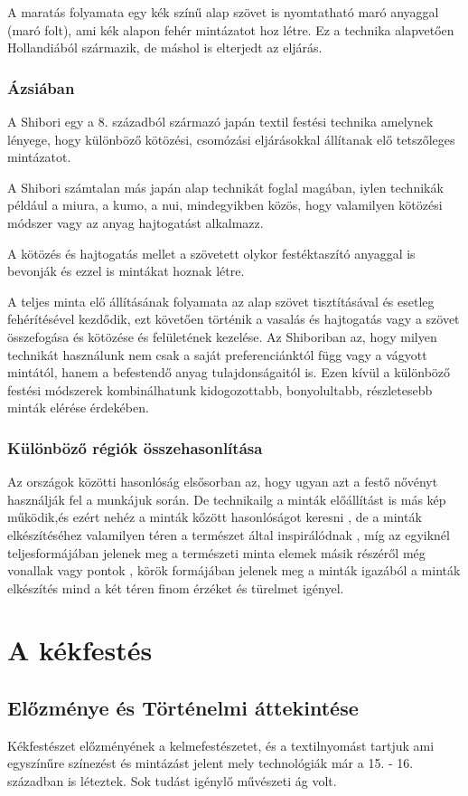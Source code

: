 \documentclass[fontsize=12pt, appendixprefix=true]{scrreprt}
\begin{document}
A maratás folyamata egy kék színű alap szövet is nyomtatható maró anyaggal (maró folt), ami kék alapon fehér mintázatot hoz  létre. Ez a technika alapvetően Hollandiából származik, de máshol is elterjedt az eljárás.

\subsection{Ázsiában}
A Shibori egy a 8. századból származó japán textil festési technika \cite{shibori} amelynek lényege, hogy különböző kötözési, csomózási eljárásokkal állítanak elő tetszőleges mintázatot.

A Shibori számtalan más japán alap technikát foglal magában, iylen technikák például a miura, a kumo, a nui, mindegyikben közös, hogy valamilyen kötözési módszer vagy az anyag hajtogatást alkalmazz. 

A kötözés és hajtogatás mellet a szövetett olykor festéktaszító anyaggal is bevonják és ezzel is mintákat hoznak létre.

A teljes minta elő állításának folyamata az alap szövet tisztításával és esetleg fehérítésével kezdődik, ezt követően történik a vasalás és hajtogatás vagy a szövet összefogása és kötözése és felületének kezelése.
Az Shiboriban az, hogy milyen technikát használunk nem csak a saját preferenciánktól függ vagy a vágyott mintától, hanem a befestendő anyag tulajdonságaitól is. Ezen kívül  a különböző festési módszerek kombinálhatunk kidogozottabb, bonyolultabb, részletesebb minták elérése érdekében. 

\subsection{Különböző régiók összehasonlítása}
   Az országok közötti hasonlóság elsősorban az, hogy ugyan azt a festő nővényt használják fel a munkájuk során.
   De technikailg a minták előállítást is más kép működik,és ezért nehéz a minták kőzött hasonlóságot keresni , de a  minták  elkészítéséhez valamilyen téren a természet által inspirálódnak , míg az egyiknél teljesformájában jelenek meg a természeti minta elemek másik részéről még vonallak vagy pontok , körök formájában jelenek meg a minták  
    igazából a minták elkészítés mind a két téren finom érzéket és türelmet igényel.

\chapter{A kékfestés}
\section{Előzménye és Történelmi áttekintése}
Kékfestészet előzményének a kelmefestészetet, és a textilnyomást tartjuk ami egyszínűre színezést és mintázást jelent mely technológiák már a 15. - 16. században is léteztek. Sok tudást igénylő művészeti ág volt.
\end{document}
